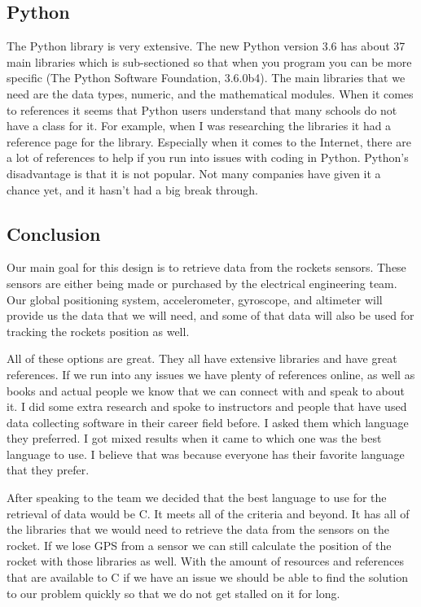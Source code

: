 \documentclass[10pt,draftclsnofoot,onecolumn]{IEEEtran}
\begin{document}
	\subsection{Python}
   	The Python library is very extensive. 
	The new Python version 3.6 has about 37 main libraries which is sub-sectioned so that when you program you can be more
	specific (The Python Software Foundation, 3.6.0b4). 
	The main libraries that we need are the data types, numeric, and the mathematical modules. 
	When it comes to references it seems that Python users understand that many schools do not have a class for it. 
	For example, when I was researching the libraries it had a reference page for the library. 
	Especially when it comes to the Internet, there are a lot of references to help if you run into issues with coding in Python.
	Python’s disadvantage is that it is not popular. 
	Not many companies have given it a chance yet, and it hasn’t had a big break through.  

   	\subsection{Conclusion}
  	Our main goal for this design is to retrieve data from the rockets sensors. 
   	These sensors are either being made or purchased by the electrical engineering team. 
   	Our global positioning system, accelerometer, gyroscope, and altimeter will provide us the data that we will need, and 
   	some of that data will also be used for tracking the rockets position as well.
   	
    All of these options are great. They all have extensive libraries and have great references. 
	If we run into any issues we have plenty of references online, as well as books and actual people we know that we can connect
	with and speak to about it. 
	I did some extra research and spoke to instructors and people that have used data collecting software in their career field
	before. 
	I asked them which language they preferred. 
	I got mixed results when it came to which one was the best language to use. 
	I believe that was because everyone has their favorite language that they prefer.  

      	After speaking to the team we decided that the best language to use for the retrieval of data would be C. 
	It meets all of the criteria and beyond. 
	It has all of the libraries that we would need to retrieve the data from the sensors on the rocket. 
	If we lose GPS from a sensor we can still calculate the position of the rocket with those libraries as well. 
	With the amount of resources and references that are available to C if we have an issue we should be able to find the solution
	to our problem quickly so that we do not get stalled on it for long.  
\end{document}
